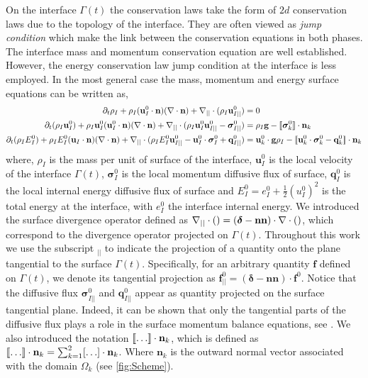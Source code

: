 On the interface $\Gamma(t)$ the conservation laws take the form of $2d$ conservation laws due to the topology of the interface. 
They are often viewed as \textit{jump condition} which make the link between the conservation equations in both phases. 
The interface mass and momentum conservation equation are well established.
However, the energy conservation law jump condition at the interface is less employed.
In the most general case the mass, momentum and energy surface equations can be written as\citep{morel2015mathematical}, 
\begin{align}
    \label{eq:dt_rhoI}
    \partial_t \rho_I
    + \rho_I (\textbf{u}_I^0 \cdot \textbf{n})(\mathbf{\nabla}\cdot \textbf{n})
    + \mathbf{\nabla}_{||}\cdot (\rho_I\textbf{u}_{I||}^0)
    &= 
    0
    \\
    \label{eq:dt_rhoIu_I}
    \partial_t (\rho_I\textbf{u}_I^0)  
    + \rho_I \textbf{u}_I^0 (\textbf{u}_I^0 \cdot \textbf{n})(\mathbf{\nabla}\cdot \textbf{n})
    + \mathbf{\nabla}_{||}\cdot (
    \rho_I\textbf{u}_I^0\textbf{u}_{I||}^0
    - \bm{\sigma}_{I||}^0)
    &= 
    \rho_I \textbf{g}
    - \llbracket 
        \bm\sigma^0_k
     \rrbracket \cdot \textbf{n}_k\\
    \label{eq:dt_rhoIE_I}
    \partial_t (\rho_IE_I^0)  
    + \rho_IE_I^0  (\textbf{u}_I \cdot \textbf{n})(\mathbf{\nabla}\cdot \textbf{n})
    + \mathbf{\nabla}_{||}\cdot (
        \rho_I E_I^0\textbf{u}_{I||}^0
        - \textbf{u}_I^0 \cdot \bm{\sigma}_I^0 
        + \textbf{q}_{I||}^0
        )
    &= 
    \textbf{u}_k^0 \cdot \textbf{g}  \rho_I
    - \llbracket \textbf{u}_k^0 \cdot \bm{\sigma}_k^0 - \textbf{q}_k^0 \rrbracket \cdot \textbf{n}_k
\end{align} 
where, $\rho_I$ is the mass per unit of surface of the interface, $\textbf{u}_I^0$ is the local velocity of the interface $\Gamma(t)$, $\bm{\sigma}_I^0$ is the local momentum diffusive flux of surface, $\textbf{q}_I^0$ is the local internal energy diffusive flux of surface and $E_I^0 = e_I^0 + \frac{1}{2}(u_I^0)^2$ is the total energy at the interface, with $e_I^0$ the interface internal energy. 
We introduced the surface divergence operator defined as $\mathbf{\nabla}_{||}\cdot ()= (\bm\delta-\textbf{nn})\cdot \mathbf{\nabla}\cdot ()$, which correspond to the divergence operator projected on $\Gamma(t)$. 
Throughout this work we use the subscript  $_{||}$ to indicate the projection of a quantity onto the plane tangential to the surface $\Gamma(t)$. 
Specifically, for an arbitrary quantity $\textbf{f}$ defined on $\Gamma(t)$, we denote its tangential projection as $\textbf{f}_{||}^0 = (\bm\delta-\textbf{nn})\cdot \textbf{f}^0$. 
Notice that the diffusive flux $\bm{\sigma}_{I||}^0$ and $\textbf{q}_{I||}^0$ appear as quantity projected on the surface tangential plane.
Indeed, it can be shown that only the tangential parts of the diffusive flux plays a role in the surface momentum balance equations, see \citet{slattery2007interfacial}.
We also introduced the notation $\llbracket \ldots \rrbracket \cdot \textbf{n}_k$, which is defined as $\llbracket \ldots \rrbracket \cdot \textbf{n}_k = \sum_{k=1}^2 [\ldots] \cdot \textbf{n}_k$.
Where $\textbf{n}_k$ is the outward normal vector associated with the domain $\Omega_k$ (see \ref{fig:Scheme}).

